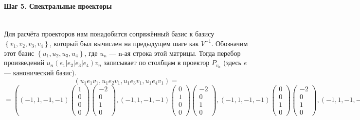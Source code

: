 \documentclass{article}
\begin{document}
\paragraph*{Шаг 5. Спектральные проекторы} \,\\
Для расчёта проекторов нам понадобится сопряжённый базис к базису $\left\{v_1, v_2, v_3, v_4\right\}$, который был вычислен на предыдущем шаге как $V^{-1}$. Обозначим этот базис $\left\{u_1, u_2, u_3, u_4\right\}$, где $u_n$ --- n-ая строка этой матрицы. Тогда перебор произведений $u_n(e_1|e_2|e_3|e_4)v_n$ записывает по столбцам в проектор $P_{v_n}$ (здесь $e$ --- канонический базис). \pagebreak
$$\left(u_1e_1v_1, u_1e_2v_1, u_1e_3v_1, u_1e_4v_1\right) =$$
$$= \left(\left(-1, 1, -1, -1\right)\begin{pmatrix}1 \\ 0 \\ 0 \\ 0\end{pmatrix}\begin{pmatrix}-2 \\ 0 \\ 1 \\ 0\end{pmatrix}, \left(-1, 1, -1, -1\right)\begin{pmatrix}0 \\ 1 \\ 0 \\ 0\end{pmatrix}\begin{pmatrix}-2 \\ 0 \\ 1 \\ 0\end{pmatrix}, \left(-1, 1, -1, -1\right)\begin{pmatrix}0 \\ 0 \\ 1 \\ 0\end{pmatrix}\begin{pmatrix}-2 \\ 0 \\ 1 \\ 0\end{pmatrix}, \left(-1, 1, -1, -1\right)\begin{pmatrix}0 \\ 0 \\ 0 \\ 1\end{pmatrix}\begin{pmatrix}-2 \\ 0 \\ 1 \\ 0\end{pmatrix}\right) =$$
\end{document}
